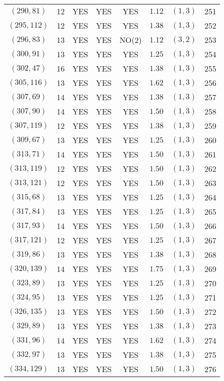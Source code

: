 \begin{longtable}{|c|c|c|c|c|c|c|c|}
$(290,81)$ & 12 & YES & YES & YES & $1.12$ & $(1,3)$ & 251\\
$(295,112)$ & 12 & YES & YES & YES & $1.38$ & $(1,3)$ & 252\\
$(296,83)$ & 13 & YES & YES & NO(2) & $1.12$ & $(3,2)$ & 253\\
$(300,91)$ & 13 & YES & YES & YES & $1.25$ & $(1,3)$ & 254\\
$(302,47)$ & 16 & YES & YES & YES & $1.38$ & $(1,3)$ & 255\\
$(305,116)$ & 13 & YES & YES & YES & $1.62$ & $(1,3)$ & 256\\
$(307,69)$ & 14 & YES & YES & YES & $1.38$ & $(1,3)$ & 257\\
$(307,90)$ & 14 & YES & YES & YES & $1.50$ & $(1,3)$ & 258\\
$(307,119)$ & 12 & YES & YES & YES & $1.38$ & $(1,3)$ & 259\\
$(309,67)$ & 13 & YES & YES & YES & $1.25$ & $(1,3)$ & 260\\
$(313,71)$ & 14 & YES & YES & YES & $1.50$ & $(1,3)$ & 261\\
$(313,119)$ & 12 & YES & YES & YES & $1.50$ & $(1,3)$ & 262\\
$(313,121)$ & 12 & YES & YES & YES & $1.50$ & $(1,3)$ & 263\\
$(315,68)$ & 13 & YES & YES & YES & $1.25$ & $(1,3)$ & 264\\
$(317,84)$ & 13 & YES & YES & YES & $1.25$ & $(1,3)$ & 265\\
$(317,93)$ & 14 & YES & YES & YES & $1.50$ & $(1,3)$ & 266\\
$(317,121)$ & 12 & YES & YES & YES & $1.25$ & $(1,3)$ & 267\\
$(319,86)$ & 13 & YES & YES & YES & $1.38$ & $(1,3)$ & 268\\
$(320,139)$ & 14 & YES & YES & YES & $1.75$ & $(1,3)$ & 269\\
$(323,89)$ & 13 & YES & YES & YES & $1.25$ & $(1,3)$ & 270\\
$(324,95)$ & 13 & YES & YES & YES & $1.25$ & $(1,3)$ & 271\\
$(326,135)$ & 13 & YES & YES & YES & $1.50$ & $(1,3)$ & 272\\
$(329,89)$ & 13 & YES & YES & YES & $1.38$ & $(1,3)$ & 273\\
$(331,96)$ & 14 & YES & YES & YES & $1.62$ & $(1,3)$ & 274\\
$(332,97)$ & 13 & YES & YES & YES & $1.38$ & $(1,3)$ & 275\\
$(334,129)$ & 13 & YES & YES & YES & $1.50$ & $(1,3)$ & 276\\

\end{longtable}
